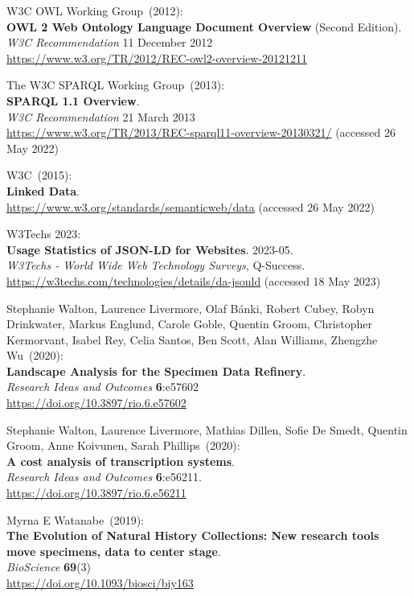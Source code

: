 \begin{thebibliography}{9}
W3C OWL Working Group~(2012): \\
\textbf{{OWL} 2 {Web Ontology Language Document Overview}} ({Second Edition}). \\
\emph{W3C Recommendation} 11 December 2012 \\
\url{https://www.w3.org/TR/2012/REC-owl2-overview-20121211} 

The W3C SPARQL Working Group~(2013): \\
\textbf{{SPARQL} 1.1 {Overview}}. \\
\emph{W3C Recommendation} 21 March 2013 \\
\url{https://www.w3.org/TR/2013/REC-sparql11-overview-20130321/} (accessed 26 May 2022)

W3C~(2015): \\
\textbf{Linked Data}.\\
\url{https://www.w3.org/standards/semanticweb/data} (accessed 26 May 2022)

W3Techs 2023: \\
\textbf{Usage Statistics of JSON-LD for Websites}. 2023-05. \\
\emph{W3Techs - World Wide Web Technology Surveys}, Q-Success.\\
\url{https://w3techs.com/technologies/details/da-jsonld} (accessed 18
May 2023)

Stephanie Walton, Laurence Livermore, Olaf Bánki, Robert Cubey, Robyn Drinkwater, Markus Englund, Carole Goble, Quentin Groom, Christopher Kermorvant, Isabel Rey, Celia Santos, Ben Scott, Alan Williams, Zhengzhe Wu~(2020): \\
\textbf{Landscape Analysis for the Specimen Data Refinery}.\\
\emph{Research Ideas and Outcomes} \textbf{6}:e57602\\
\url{https://doi.org/10.3897/rio.6.e57602}

Stephanie Walton, Laurence Livermore, Mathias Dillen, Sofie De Smedt, Quentin Groom, Anne Koivunen, Sarah Phillips~(2020): \\
\textbf{A cost analysis of transcription systems}. \\
\emph{Research Ideas and Outcomes} \textbf{6}:e56211.\\
\url{https://doi.org/10.3897/rio.6.e56211}

Myrna E Watanabe~(2019): \\
\textbf{The Evolution of Natural History Collections: New research tools move specimens, data to center stage}.\\
\emph{BioScience} \textbf{69}(3)\\
\url{https://doi.org/10.1093/biosci/biy163}


\end{thebibliography}
